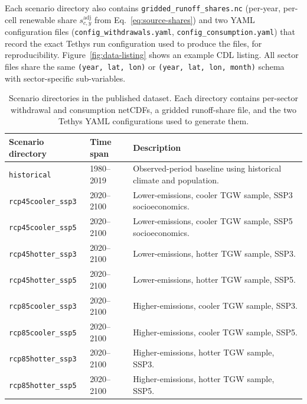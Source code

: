 \documentclass[fleqn,10pt]{wlscirep}
\begin{document}
Each scenario directory also contains \texttt{gridded\_runoff\_shares.nc} (per-year, per-cell renewable share $s^{\mathrm{adj}}_{c,y}$ from Eq.~\ref{eq:source-shares}) and two YAML configuration files (\texttt{config\_withdrawals.yaml}, \texttt{config\_consumption.yaml}) that record the exact Tethys run configuration used to produce the files, for reproducibility. Figure~\ref{fig:data-listing} shows an example CDL listing. All sector files share the same \texttt{(year, lat, lon)} or \texttt{(year, lat, lon, month)} schema with sector-specific sub-variables.

\begin{table}[ht]
\centering
\begin{tabular}{lll}
\toprule
\textbf{Scenario directory} & \textbf{Time span} & \textbf{Description} \\
\midrule
\texttt{historical}         & 1980--2019 & Observed-period baseline using historical climate and population. \\
\texttt{rcp45cooler\_ssp3}  & 2020--2100 & Lower-emissions, cooler TGW sample, SSP3 socioeconomics. \\
\texttt{rcp45cooler\_ssp5}  & 2020--2100 & Lower-emissions, cooler TGW sample, SSP5 socioeconomics. \\
\texttt{rcp45hotter\_ssp3}  & 2020--2100 & Lower-emissions, hotter TGW sample, SSP3. \\
\texttt{rcp45hotter\_ssp5}  & 2020--2100 & Lower-emissions, hotter TGW sample, SSP5. \\
\texttt{rcp85cooler\_ssp3}  & 2020--2100 & Higher-emissions, cooler TGW sample, SSP3. \\
\texttt{rcp85cooler\_ssp5}  & 2020--2100 & Higher-emissions, cooler TGW sample, SSP5. \\
\texttt{rcp85hotter\_ssp3}  & 2020--2100 & Higher-emissions, hotter TGW sample, SSP3. \\
\texttt{rcp85hotter\_ssp5}  & 2020--2100 & Higher-emissions, hotter TGW sample, SSP5. \\
\bottomrule
\end{tabular}
\caption{Scenario directories in the published dataset. Each directory contains per-sector withdrawal and consumption netCDFs, a gridded runoff-share file, and the two Tethys YAML configurations used to generate them.}
\label{tab:scenarios}
\end{table}
\end{document}
